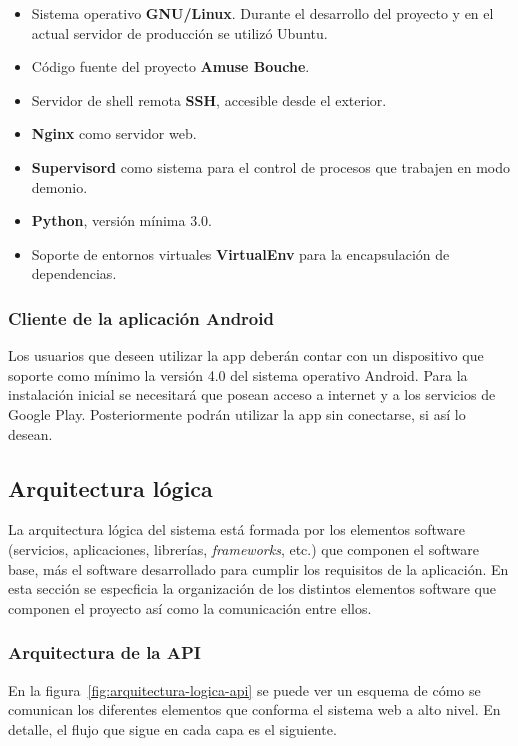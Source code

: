 \begin{itemize}
\item Sistema operativo \textbf{GNU/Linux}. Durante el desarrollo del proyecto y
  en el actual servidor de producción se utilizó Ubuntu.
\item Código fuente del proyecto \textbf{Amuse Bouche}.
\item Servidor de shell remota \textbf{SSH}, accesible desde el exterior.
\item \textbf{Nginx} como servidor web.
\item \textbf{Supervisord} como sistema para el control de procesos que trabajen
  en modo demonio.
\item \textbf{Python}, versión mínima 3.0.
\item Soporte de entornos virtuales \textbf{VirtualEnv} para la encapsulación de
  dependencias.
\end{itemize}

\subsubsection{Cliente de la aplicación Android}

Los usuarios que deseen utilizar la app deberán contar con un dispositivo que
soporte como mínimo la versión 4.0 del sistema operativo Android. Para la
instalación inicial se necesitará que posean acceso a internet y a los servicios
de Google Play. Posteriormente podrán utilizar la app sin conectarse, si así lo
desean.


\subsection{Arquitectura lógica}

La arquitectura lógica del sistema está formada por los elementos software
(servicios, aplicaciones, librerías, \textit{frameworks}, etc.) que componen el
software base, más el software desarrollado para cumplir los requisitos de la
aplicación. En esta sección se especficia la organización de los distintos
elementos software que componen el proyecto así como la comunicación entre
ellos. 

\subsubsection{Arquitectura de la API}
\label{subsec:arquitectura-logica-api}

En la figura~\ref{fig:arquitectura-logica-api} se puede ver un esquema de cómo se
comunican los diferentes elementos que conforma el sistema web a alto nivel. En
detalle, el flujo que sigue en cada capa es el siguiente.

